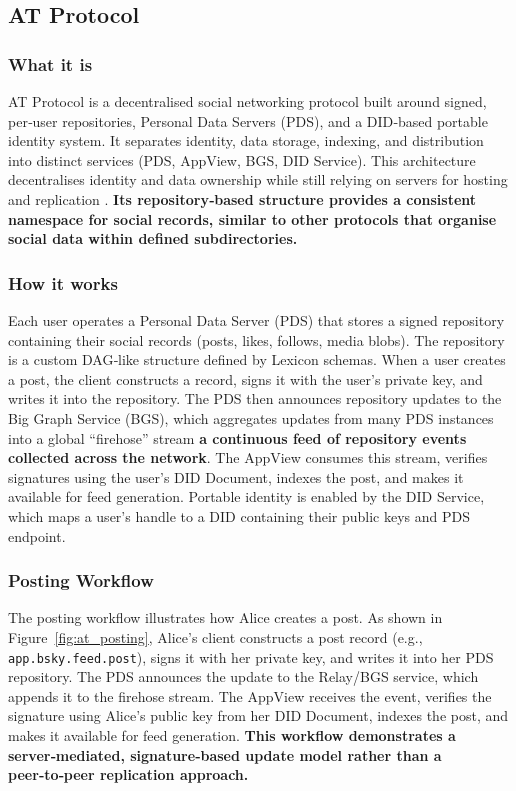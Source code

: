 \subsection{AT Protocol}

\subsubsection{What it is}
AT Protocol is a decentralised social networking protocol built around signed, per‑user repositories,
Personal Data Servers (PDS), and a DID‑based portable identity system. It separates identity, data
storage, indexing, and distribution into distinct services (PDS, AppView, BGS, DID Service). This
architecture decentralises identity and data ownership while still relying on servers for hosting and
replication \cite{atproto2026}. \textbf{Its repository‑based structure provides a consistent namespace for social records,
similar to other protocols that organise social data within defined subdirectories.}

\subsubsection{How it works}
Each user operates a Personal Data Server (PDS) that stores a signed repository containing their social records (posts, likes, follows, media blobs). The repository is a custom DAG‑like structure defined by Lexicon schemas. When a user creates a post, the client constructs a record, signs it with the user’s private key, and writes it into the repository. The PDS then announces repository updates to the Big Graph Service (BGS), which aggregates updates from many PDS instances into a global “firehose” stream \textbf{a continuous feed of repository events collected across the network}. The AppView consumes this stream, verifies signatures using the user’s DID Document, indexes the post, and makes it available for feed generation. Portable identity is enabled by the DID Service, which maps a user’s handle to a DID containing their public keys and
PDS endpoint.

\subsubsection{Posting Workflow}
The posting workflow illustrates how Alice creates a post. As shown in
Figure~\ref{fig:at_posting}, Alice’s client constructs a post record (e.g., \texttt{app.bsky.feed.post}),
signs it with her private key, and writes it into her PDS repository. The PDS announces the update
to the Relay/BGS service, which appends it to the firehose stream. The AppView receives the event,
verifies the signature using Alice’s public key from her DID Document, indexes the post, and makes
it available for feed generation. \textbf{This workflow demonstrates a server‑mediated, signature‑based
update model rather than a peer‑to‑peer replication approach.}


